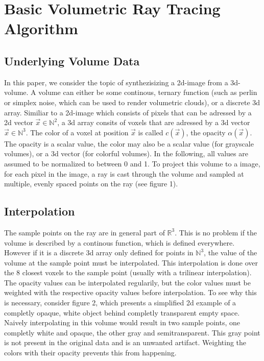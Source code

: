 \section{Basic Volumetric Ray Tracing Algorithm}
\subsection{Underlying Volume Data}
In this paper, we consider the topic of synthezisizing a 2d-image from a 3d-volume.
A volume can either be some continous, ternary function (such as perlin or simplex noise, which can be used to render volumetric clouds), or a discrete 3d array.
Similiar to a 2d-image which consists of pixels that can be adressed by a 2d vector $\vec{x} \in \mathbb{N}^2$, a 3d array consits of voxels that are adressed by a 3d vector $\vec{x} \in \mathbb{N}^3$. The color of a voxel at position $\vec{x}$ is called $c(\vec{x})$, the opacity $\alpha(\vec{x})$. The opacity is a scalar value, the color may also be a scalar value (for grayscale volumes), or a 3d vector (for colorful volumes). In the following, all values are assumed to be normalized to between 0 and 1. To project this volume to a image, for each pixel in the image, a ray is cast through the volume and sampled at multiple, evenly spaced points on the ray (see figure 1).
\subsection{Interpolation}
The sample points on the ray are in general part of $\mathbb{R}^3$. This is no problem if the volume is described by a continous function, which is defined everywhere. However if it is a discrete 3d array only defined for points in $\mathbb{N}^3$, the value of the volume at the sample point must be interpolated.
 This interpolation is done over the 8 closest voxels to the sample point (usually with a trilinear interpolation). The opacity values can be interpolated regularily, but the color values must be weighted with the respective opacity values before interpolation. To see why this is necessary, consider figure 2, which presents a simplified 2d example of a completly opaque, white object behind completly transparent empty space. Naively interpolating in this volume would result in two sample points, one completly white and opaque, the other gray and semitransparent. This gray point is not present in the original data and is an unwanted artifact. Weighting the colors with their opacity prevents this from happening.

